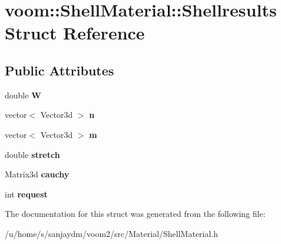 \hypertarget{structvoom_1_1_shell_material_1_1_shellresults}{
\section{voom::ShellMaterial::Shellresults Struct Reference}
\label{structvoom_1_1_shell_material_1_1_shellresults}
}
\subsection*{Public Attributes}
\begin{DoxyCompactItemize}
\item 
\hypertarget{structvoom_1_1_shell_material_1_1_shellresults_aad97b0ab48c190804894323c26c33af0}{
double {\bfseries W}}
\label{structvoom_1_1_shell_material_1_1_shellresults_aad97b0ab48c190804894323c26c33af0}

\item 
\hypertarget{structvoom_1_1_shell_material_1_1_shellresults_af5f76de5621d2583b170d0cb23b2fcd0}{
vector$<$ Vector3d $>$ {\bfseries n}}
\label{structvoom_1_1_shell_material_1_1_shellresults_af5f76de5621d2583b170d0cb23b2fcd0}

\item 
\hypertarget{structvoom_1_1_shell_material_1_1_shellresults_a65ce424145609a0576c23874ea3f6566}{
vector$<$ Vector3d $>$ {\bfseries m}}
\label{structvoom_1_1_shell_material_1_1_shellresults_a65ce424145609a0576c23874ea3f6566}

\item 
\hypertarget{structvoom_1_1_shell_material_1_1_shellresults_af01b3a883a506cf381cce82b149e2547}{
double {\bfseries stretch}}
\label{structvoom_1_1_shell_material_1_1_shellresults_af01b3a883a506cf381cce82b149e2547}

\item 
\hypertarget{structvoom_1_1_shell_material_1_1_shellresults_aea107f4d45a2e61b49215ac1ff0556ed}{
Matrix3d {\bfseries cauchy}}
\label{structvoom_1_1_shell_material_1_1_shellresults_aea107f4d45a2e61b49215ac1ff0556ed}

\item 
\hypertarget{structvoom_1_1_shell_material_1_1_shellresults_a2f1dd9ce42c7aca9604a63c0690eba5d}{
int {\bfseries request}}
\label{structvoom_1_1_shell_material_1_1_shellresults_a2f1dd9ce42c7aca9604a63c0690eba5d}

\end{DoxyCompactItemize}


The documentation for this struct was generated from the following file:\begin{DoxyCompactItemize}
\item 
/u/home/s/sanjaydm/voom2/src/Material/ShellMaterial.h\end{DoxyCompactItemize}
